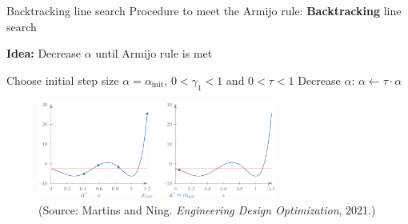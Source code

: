 \documentclass[11pt,compress,t,notes=noshow, xcolor=table]{beamer}
\begin{document}
	\begin{vbframe}{Backtracking line search}
		\small 
    	Procedure to meet the Armijo rule: \textbf{Backtracking} line search

        \vspace{0.3\baselineskip}
		
		\textbf{Idea:} Decrease $\alpha$ until Armijo rule is met
		
		\begin{algorithm}[H]
            \footnotesize
			\caption{Backtracking line search}
			\begin{algorithmic}[1]
				\State Choose initial step size $\alpha = \alpha_{\text{init}}$, $0 < \gamma_1 < 1$ and $0 < \tau < 1$
				\State Decrease $\alpha$: $\alpha \leftarrow \tau \cdot \alpha$
				\EndWhile
			\end{algorithmic}
		\end{algorithm}

        \vspace*{-\baselineskip}

        \begin{figure}
            \centering
            \includegraphics[width=0.7\textwidth]{figure_man/backtracking-example.png}
            \caption*{\footnotesize (Source: Martins and Ning. \textit{Engineering Design Optimization}, 2021.)}
        \end{figure}
		
	\end{vbframe}
	
\end{document}
